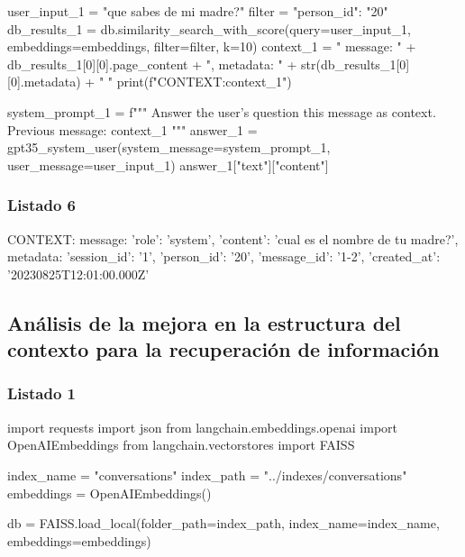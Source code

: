 \begin{APACode}
user_input_1 = "que sabes de mi madre?"
filter = {"person_id": "20"}
db_results_1 = db.similarity_search_with_score(query=user_input_1, 
                                               embeddings=embeddings, 
                                               filter=filter, k=10)
context_1 = "{ message: " + db_results_1[0][0].page_content + 
            ", metadata: " + str(db_results_1[0][0].metadata) + " }"
print(f"CONTEXT:{context_1}")

system_prompt_1 = f"""
Answer the user's question this message as context. 
Previous message: {context_1}
"""
answer_1 = gpt35_system_user(system_message=system_prompt_1, 
                           user_message=user_input_1)
answer_1["text"]["content"]
\end{APACode}

\subsubsection{Listado 6}
\label{anexo:code-4-1-6-6}

\begin{APACode}
CONTEXT:{ message: {'role': 'system', 'content': 'cual es el nombre de tu madre?'}, 
metadata: {'session_id': '1', 'person_id': '20', 'message_id': '1-2', 
'created_at': '20230825T12:01:00.000Z'} }
\end{APACode}

\subsection{Análisis de la mejora en la estructura del contexto para la recuperación de información}

\subsubsection{Listado 1}
\label{anexo:code-4-1-7-1}

\begin{APACode}
import requests 
import json
from langchain.embeddings.openai import OpenAIEmbeddings 
from langchain.vectorstores import FAISS

index_name = "conversations"
index_path = "../indexes/conversations" 
embeddings = OpenAIEmbeddings()

db = FAISS.load_local(folder_path=index_path, index_name=index_name, 
                      embeddings=embeddings)
\end{APACode}

